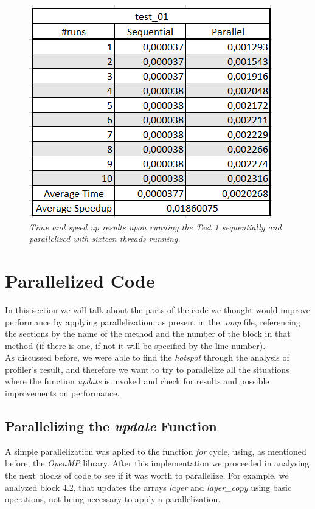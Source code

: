 \documentclass[10pt,journal,compsoc]{IEEEtran}
\begin{document}
\begin{figure}[b]
    \centering
    \includegraphics[scale=0.5]{test1_results.png}
    \caption{\itshape{Time and speed up results upon running the Test 1 sequentially and parallelized with sixteen threads running.}}
    \label{fig:test1}
\end{figure}

\section{Parallelized Code}

In this section we will talk about the parts of the code we thought would improve performance by applying parallelization, as present in the {\itshape .omp} file, referencing the sections by the name of the method and the number of the block in that method (if there is one, if not it will be specified by the line number).
\\As discussed before, we were able to find the {\itshape hotspot} through the analysis of profiler's result, and therefore we want to try to parallelize all the situations where the function {\itshape update} is invoked and check for results and possible improvements on performance.

\subsection{Parallelizing the {\itshape update} Function}

A simple parallelization was aplied to the function {\itshape for} cycle, using, as mentioned before, the {\itshape OpenMP} library. After this implementation we proceeded in analysing the next blocks of code to see if it was worth to parallelize. For example, we analyzed block 4.2, that updates the arrays {\itshape layer} and {\itshape layer\_copy} using basic operations, not being necessary to apply a parallelization.
\end{document}
